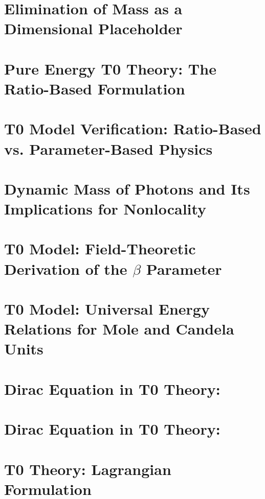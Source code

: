 \chapter{Elimination of Mass as a Dimensional Placeholder}

\chapter{Pure Energy T0 Theory: The Ratio-Based Formulation}

\chapter{T0 Model Verification: Ratio-Based vs. Parameter-Based Physics}

\chapter{Dynamic Mass of Photons and Its Implications for Nonlocality}

\chapter{T0 Model: Field-Theoretic Derivation of the $\beta$ Parameter}

\chapter{T0 Model: Universal Energy Relations for Mole and Candela Units}

\chapter{Dirac Equation in T0 Theory:}

\chapter{Dirac Equation in T0 Theory:}

\chapter{T0 Theory: Lagrangian Formulation}



